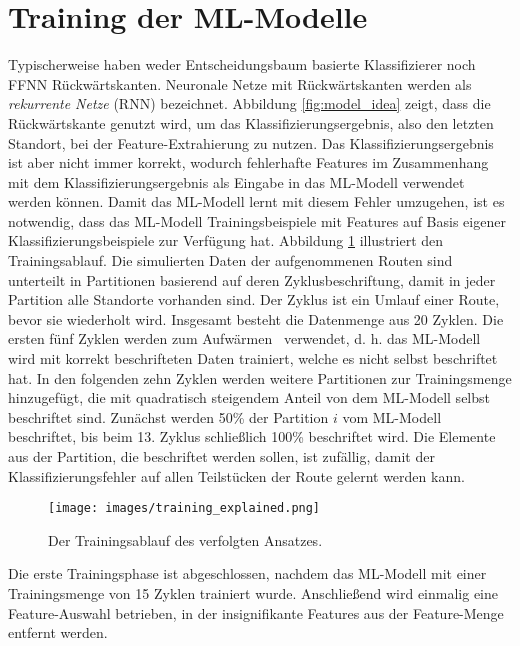 \section{Training der ML-Modelle}
\label{sec:model_training}
Typischerweise haben weder Entscheidungsbaum basierte Klassifizierer noch FFNN Rückwärtskanten.
Neuronale Netze mit Rückwärtskanten werden als \textit{rekurrente Netze} (RNN) bezeichnet.
Abbildung \ref{fig:model_idea} zeigt, dass die Rückwärtskante genutzt wird, um das Klassifizierungsergebnis,
also den letzten Standort, bei der Feature-Extrahierung zu nutzen.
Das Klassifizierungsergebnis ist aber nicht immer korrekt, wodurch fehlerhafte Features im Zusammenhang
mit dem Klassifizierungsergebnis als Eingabe in das ML-Modell verwendet werden können.
Damit das ML-Modell lernt mit diesem Fehler umzugehen, ist es notwendig, dass das ML-Modell Trainingsbeispiele mit
Features auf Basis eigener Klassifizierungsbeispiele zur Verfügung hat.
\newline
\newline
Abbildung \ref{fig:training_explained} illustriert den Trainingsablauf.
Die simulierten Daten der aufgenommenen Routen sind unterteilt in Partitionen basierend auf deren Zyklusbeschriftung,
damit in jeder Partition alle Standorte vorhanden sind.
Der Zyklus ist ein Umlauf einer Route, bevor sie wiederholt wird.
Insgesamt besteht die Datenmenge aus 20 Zyklen.
Die ersten fünf Zyklen werden zum \glqq Aufwärmen \grqq\ verwendet,
d. h. das ML-Modell wird mit korrekt beschrifteten Daten trainiert, welche es nicht selbst beschriftet hat.
In den folgenden zehn Zyklen werden weitere Partitionen zur Trainingsmenge hinzugefügt, die mit quadratisch steigendem Anteil von dem ML-Modell selbst beschriftet sind.
Zunächst werden 50\% der Partition $i$ vom ML-Modell beschriftet, bis beim 13. Zyklus schließlich 100\% beschriftet wird.
Die Elemente aus der Partition, die beschriftet werden sollen, ist zufällig, damit der Klassifizierungsfehler auf allen Teilstücken der Route gelernt werden kann.
\begin{figure}[h!]
    \centering
    \texttt{[image: images/training\_explained.png]}
    \caption{Der Trainingsablauf des verfolgten Ansatzes.}
    \label{fig:training_explained}
\end{figure}
\newline
Die erste Trainingsphase ist abgeschlossen, nachdem das ML-Modell mit einer Trainingsmenge von 15 Zyklen trainiert wurde.
Anschließend wird einmalig eine Feature-Auswahl betrieben, in der insignifikante Features aus der Feature-Menge entfernt werden.
